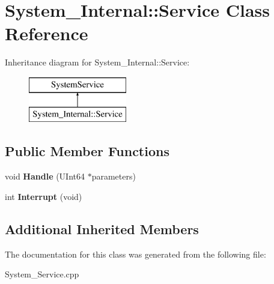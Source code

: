 \hypertarget{class_system___internal_1_1_service}{}\section{System\+\_\+\+Internal\+:\+:Service Class Reference}
\label{class_system___internal_1_1_service}
Inheritance diagram for System\+\_\+\+Internal\+:\+:Service\+:\begin{figure}[H]
\begin{center}
\leavevmode
\includegraphics[height=2.000000cm]{class_system___internal_1_1_service}
\end{center}
\end{figure}
\subsection*{Public Member Functions}
\begin{DoxyCompactItemize}
\item 
\mbox{\label{class_system___internal_1_1_service_a505a3faf1f0f0a2f799746f96465d20a}} 
void {\bfseries Handle} (U\+Int64 $\ast$parameters)
\item 
\mbox{\label{class_system___internal_1_1_service_abcb3c20543603258bebb97a11e8ce74c}} 
int {\bfseries Interrupt} (void)
\end{DoxyCompactItemize}
\subsection*{Additional Inherited Members}


The documentation for this class was generated from the following file\+:\begin{DoxyCompactItemize}
\item 
System\+\_\+\+Service.\+cpp\end{DoxyCompactItemize}
